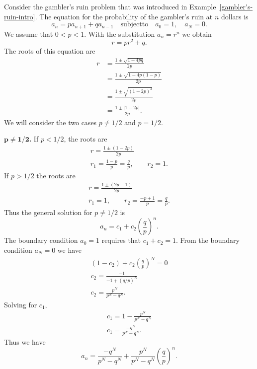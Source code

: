 \begin{Example}
  Consider the gambler's ruin problem that was introduced in 
  Example~\ref{gambler's-ruin-intro}.
  The equation for the probability of the gambler's ruin at $n$ dollars is
  \[ a_n = pa_{n+1} + q a_{n-1} \quad \mathrm{subject to}\quad a_0=1, \quad
  a_N = 0.\]
  We assume that $0<p<1$.  
  With the substitution $a_n = r^n$ we obtain
  \[ r = p r^2 + q. \]
  The roots of this equation are
  \begin{align*}
    r       &= \frac{1 \pm \sqrt{1 - 4p q}}{2p} \\
    &= \frac{1 \pm \sqrt{1 - 4p(1-p)}}{2p} \\
    &= \frac{1 \pm \sqrt{(1 - 2p)^2}}{2p} \\
    &= \frac{1 \pm |1-2p|}{2p}.
  \end{align*}
  We will consider the two cases $p \neq 1/2$ and $p = 1/2$.
  \begin{description}
  \item{$\mathbf{p \boldsymbol{\neq} 1 \boldsymbol{/} 2}$\textbf{.}} 
    If $p < 1/2$, the roots are 
    \begin{gather*}
      r = \frac{1 \pm (1-2p)}{2p} \\
      r_1 = \frac{1-p}{p} = \frac{q}{p}, \qquad r_2 = 1.
    \end{gather*}
    If $p > 1/2$ the roots are
    \begin{gather*}
      r = \frac{1 \pm (2p-1)}{2p} \\
      r_1 = 1, \qquad r_2 = \frac{-p + 1}{p} = \frac{q}{p}.
    \end{gather*}
    Thus the general solution for $p \neq 1/2$ is
    \[a_n = c_1  + c_2\left(\frac{q}{p}\right)^n.\]
    The boundary condition $a_0=1$ requires that $c_1 + c_2 = 1$.  From the 
    boundary condition $a_N=0$ we have
    \begin{gather*}
      (1-c_2) + c_2 \left(\frac{q}{p}\right)^N = 0 \\
      c_2 = \frac{-1}{-1 + (q/p)^N} \\
      c_2 = \frac{p^N}{p^N-q^N}.
    \end{gather*}
    Solving for $c_1$,
    \begin{gather*}
      c_1 = 1 - \frac{p^N}{p^N-q^N} \\
      c_1 = \frac{-q^N}{p^N - q^N}.
    \end{gather*}
    Thus we have 
    \[\boxed{a_n =  \frac{-q^N}{p^N-q^N} 
      + \frac{p^N}{p^N-q^N}\left(\frac{q}{p}\right)^n.} \]


\end{description}
\end{Example}

